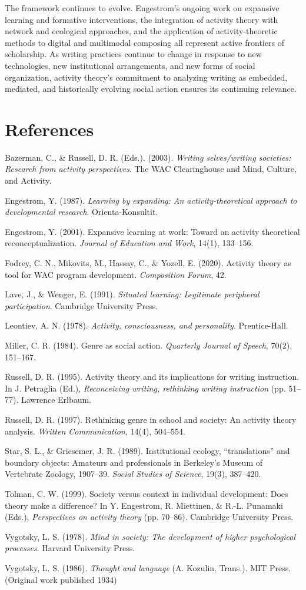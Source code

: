 \documentclass[12pt]{article}
\begin{document}
The framework continues to evolve. Engestrom's ongoing work on expansive learning and formative interventions, the integration of activity theory with network and ecological approaches, and the application of activity-theoretic methods to digital and multimodal composing all represent active frontiers of scholarship. As writing practices continue to change in response to new technologies, new institutional arrangements, and new forms of social organization, activity theory's commitment to analyzing writing as embedded, mediated, and historically evolving social action ensures its continuing relevance.

\section*{References}

Bazerman, C., \& Russell, D. R. (Eds.). (2003). \textit{Writing selves/writing societies: Research from activity perspectives}. The WAC Clearinghouse and Mind, Culture, and Activity.

Engestrom, Y. (1987). \textit{Learning by expanding: An activity-theoretical approach to developmental research}. Orienta-Konsultit.

Engestrom, Y. (2001). Expansive learning at work: Toward an activity theoretical reconceptualization. \textit{Journal of Education and Work}, 14(1), 133--156.

Fodrey, C. N., Mikovits, M., Hassay, C., \& Yozell, E. (2020). Activity theory as tool for WAC program development. \textit{Composition Forum}, 42.

Lave, J., \& Wenger, E. (1991). \textit{Situated learning: Legitimate peripheral participation}. Cambridge University Press.

Leontiev, A. N. (1978). \textit{Activity, consciousness, and personality}. Prentice-Hall.

Miller, C. R. (1984). Genre as social action. \textit{Quarterly Journal of Speech}, 70(2), 151--167.

Russell, D. R. (1995). Activity theory and its implications for writing instruction. In J. Petraglia (Ed.), \textit{Reconceiving writing, rethinking writing instruction} (pp. 51--77). Lawrence Erlbaum.

Russell, D. R. (1997). Rethinking genre in school and society: An activity theory analysis. \textit{Written Communication}, 14(4), 504--554.

Star, S. L., \& Griesemer, J. R. (1989). Institutional ecology, ``translations'' and boundary objects: Amateurs and professionals in Berkeley's Museum of Vertebrate Zoology, 1907--39. \textit{Social Studies of Science}, 19(3), 387--420.

Tolman, C. W. (1999). Society versus context in individual development: Does theory make a difference? In Y. Engestrom, R. Miettinen, \& R.-L. Punamaki (Eds.), \textit{Perspectives on activity theory} (pp. 70--86). Cambridge University Press.

Vygotsky, L. S. (1978). \textit{Mind in society: The development of higher psychological processes}. Harvard University Press.

Vygotsky, L. S. (1986). \textit{Thought and language} (A. Kozulin, Trans.). MIT Press. (Original work published 1934)
\end{document}
